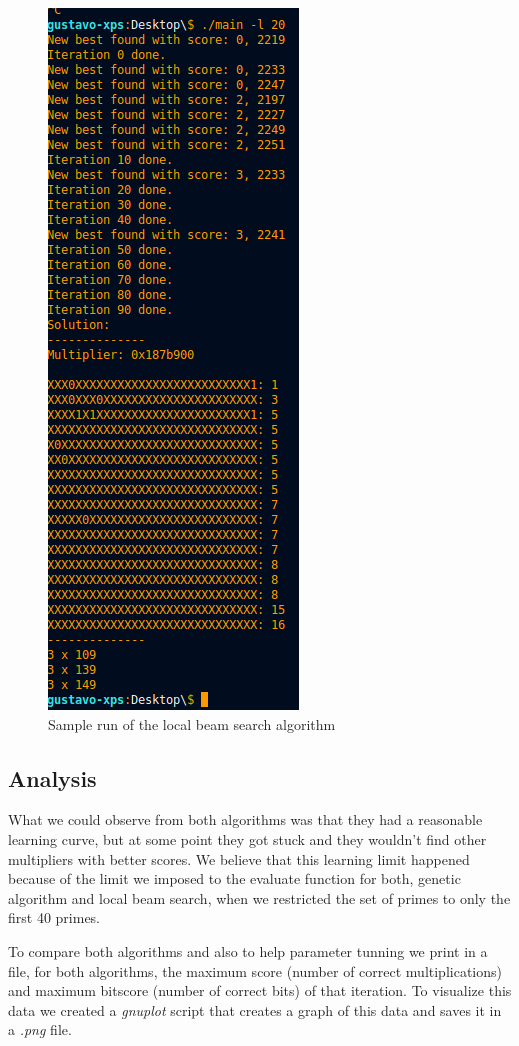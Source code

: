\documentclass[12pt]{article}
\begin{document}
\begin{figure}[h]
    \centerline{\includegraphics[scale=.5]{LBSampleRun}}
\caption{Sample run of the local beam search algorithm}
\end{figure}

\subsection{Analysis}
What we could observe from both algorithms was that they had a reasonable learning curve, but at some point they got stuck and they wouldn't find other multipliers with better scores. We believe that this learning limit happened because of the limit we imposed to the evaluate function for both, genetic algorithm and local beam search, when we restricted the set of primes to only the first 40 primes.

To compare both algorithms and also to help parameter tunning we print in a file, for both algorithms, the maximum score (number of correct multiplications) and maximum bitscore (number of correct bits) of that iteration. To visualize this data we created a \emph{gnuplot} script that creates a graph of this data and saves it in a \emph{.png} file. 
\end{document}
